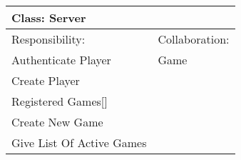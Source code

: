 \vspace{0.4cm}
\begin{tabular}{|p{7cm}|p{7cm}|} \hline
\multicolumn{2}{|l|}{Class:  Server} \\ \hline
Responsibility:  & Collaboration:  \\ \hline
 Authenticate Player &  Game \\ 
 Create Player &   \\ 
 Registered Games[] &   \\ 
 Create New Game &   \\ 
 Give List Of Active Games &   \\ 
\hline
\end{tabular}
\vspace{0.8cm}
